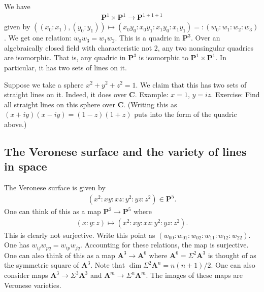 \documentclass[11pt, oneside,margin=1in]{article}
\begin{document}
\begin{example}\label{seg}\text{}
We have
\begin{align*}
	\mathbf{P}^1\times \mathbf{P}^1\longrightarrow \mathbf{P}^{1+1+1}
\end{align*}
given by $((x_0:x_1), (y_0:y_1)) \longmapsto (x_0y_0:x_0y_1: x_1y_0: x_1y_1) =:(w_0:w_1:w_2:w_3)$. We get one relation: $w_0w_3=w_1w_2$. This is a quadric in $\mathbf{P}^3$. Over an algebraically closed field with characteristic not $2$, any two nonsingular quadrics are isomorphic. That is, any quadric in $\mathbf{P}^3$ is isomorphic to $\mathbf{P}^1\times \mathbf{P}^1$. In particular, it has two sets of lines on it. 

Suppose we take a sphere $x^2+y^2+z^2=1$. We claim that this has two sets of straight lines on it. Indeed, it does over $\mathbf{C}$. Example: $x=1$, $y=iz$. Exercise: Find all straight lines on this sphere over $\mathbf{C}$. (Writing this as $(x+iy) (x-iy)= (1-z) (1+z)$ puts into the form of the quadric above.)
\end{example}


\subsection{The Veronese surface and the variety of lines in space}
\begin{example}\label{}\text{}
 The Veronese surface is given by
\begin{align*}
	(x^2:xy:xz:y^2:yz:z^2)\in  \mathbf{P}^5.
\end{align*}
One can think of this as a map $\mathbf{P}^2\longrightarrow \mathbf{P}^5$ where
\begin{align*}
	(x:y:z) \longmapsto (x^2:xy:xz:y^2:yz:z^2).	
\end{align*}
This is clearly not surjective. Write this point as $(w_{00}:w_{01}:w_{02}:w_{11}:w_{12}:w_{22})$. One has $w_{ij}w_{pq} = w_{ip}w_{jq}$. Accounting for these relations, the map is surjective. One can also think of this as a map $\mathbf{A}^3\longrightarrow \mathbf{A}^6$ where $\mathbf{A}^6 = \Sigma^2\mathbf{A}^3$ is thought of as the symmetric square of $\mathbf{A}^3$. Note that $\dim \Sigma^2\mathbf{A}^n = n(n+1)/2$. One can also consider maps $\mathbf{A}^3\longrightarrow \Sigma^3 \mathbf{A}^3$ and $\mathbf{A}^m \longrightarrow \Sigma^n \mathbf{A}^m$. The images of these maps are Veronese varieties.
\end{example}
\end{document}
